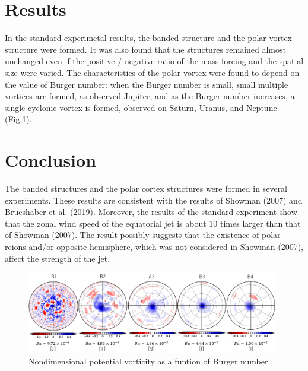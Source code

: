 \documentclass[a4j,multicol,8pt]{jarticle}
\begin{document}
\begin{multicols}{2}
\section{Results}
\vspace{-0.8zh}
In the standard experimetal results,
the banded structure and
the polar vortex structure were formed.
%
%
It was also found that the structures remained almost unchanged
even if the positive / negative
ratio of the mass forcing and the spatial size were varied.
%
%
The characteristics of the polar vortex were
found to depend on the value of Burger number:
when the Burger number is small,
small multiple vortices are formed, as observed Jupiter,
and as the Burger number increases,
a single cyclonic vortex is formed, observed on Saturn, Uranus, and Neptune (Fig.1).
\vspace{-2zh}
\section{Conclusion}
\vspace{-0.8zh}
The banded structures and the polar cortex structures were 
formed in several experiments.
These results are consistent with the results of Showman (2007) and Brueshaber et al. (2019).
%
Moreover, the results of the standard experiment show that
the zonal wind speed of the equatorial jet is
about 10 times larger than that of Showman (2007).
%
The result possibly suggests that the existence of polar reions and/or opposite hemisphere,
which was not considered in Showman (2007), affect the strength of the jet.
%
\end{multicols}
\begin{figure}[b]
  \begin{center}
  \includegraphics[width=11cm]{./fig/case1_nonqv_a.png}
  \caption{\footnotesize{Nondimensional potential vorticity as a funtion of Burger number.
}}
  \label{case1:nonqv_a}
  \end{center}
\end{figure}
\end{document}
